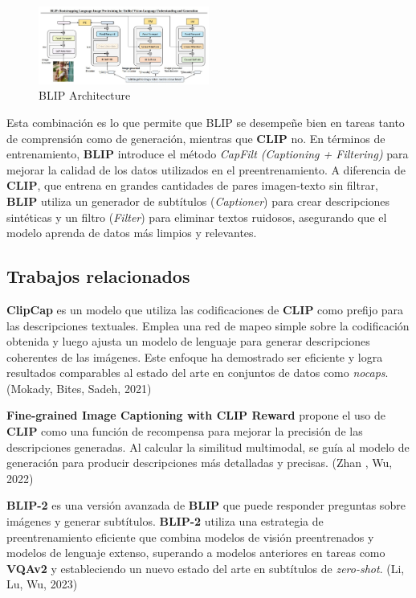 \documentclass[14pt]{extarticle}
\begin{document}
\begin{figure}[h]
    \centering
    \includegraphics[width=0.5\textwidth]{./images/blip.jpg}
    \caption{BLIP Architecture}
    \label{fig:blip}
\end{figure}

Esta combinación es lo que permite que BLIP se desempeñe bien en tareas tanto de comprensión como de generación, mientras que \textbf{CLIP} no. En términos de entrenamiento, \textbf{BLIP} introduce el método \textit{CapFilt (Captioning + Filtering)} para mejorar la calidad de los datos utilizados en el preentrenamiento. A diferencia de \textbf{CLIP}, que entrena en grandes cantidades de pares imagen-texto sin filtrar, \textbf{BLIP} utiliza un generador de subtítulos (\textit{Captioner}) para crear descripciones sintéticas y un filtro (\textit{Filter}) para eliminar textos ruidosos, asegurando que el modelo aprenda de datos más limpios y relevantes.

\subsection{Trabajos relacionados}

\textbf{ClipCap} es un modelo que utiliza las codificaciones de \textbf{CLIP} como prefijo para las descripciones textuales. Emplea una red de mapeo simple sobre la codificación obtenida y luego ajusta un modelo de lenguaje para generar descripciones coherentes de las imágenes. Este enfoque ha demostrado ser eficiente y logra resultados comparables al estado del arte en conjuntos de datos como \textit{nocaps}. (Mokady, Bites,  Sadeh, 2021)

\textbf{Fine-grained Image Captioning with CLIP Reward} propone el uso de \textbf{CLIP} como una función de recompensa para mejorar la precisión de las descripciones generadas. Al calcular la similitud multimodal, se guía al modelo de generación para producir descripciones más detalladas y precisas. (Zhan , Wu, 2022)

\textbf{BLIP-2} es una versión avanzada de \textbf{BLIP} que puede responder preguntas sobre imágenes y generar subtítulos. \textbf{BLIP-2} utiliza una estrategia de preentrenamiento eficiente que combina modelos de visión preentrenados y modelos de lenguaje extenso, superando a modelos anteriores en tareas como \textbf{VQAv2} y estableciendo un nuevo estado del arte en subtítulos de \textit{zero-shot}. (Li, Lu,  Wu, 2023)
\end{document}
